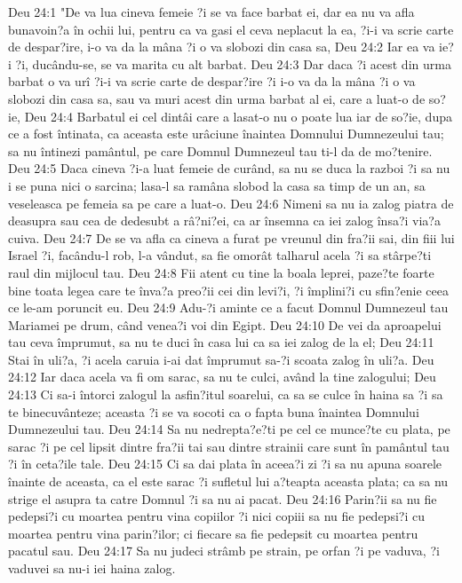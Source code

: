 Deu 24:1  "De va lua cineva femeie ?i se va face barbat ei, dar ea nu va afla bunavoin?a în ochii lui, pentru ca va gasi el ceva neplacut la ea, ?i-i va scrie carte de despar?ire, i-o va da la mâna ?i o va slobozi din casa sa,
Deu 24:2  Iar ea va ie?i ?i, ducându-se, se va marita cu alt barbat.
Deu 24:3  Dar daca ?i acest din urma barbat o va urî ?i-i va scrie carte de despar?ire ?i i-o va da la mâna ?i o va slobozi din casa sa, sau va muri acest din urma barbat al ei, care a luat-o de so?ie,
Deu 24:4  Barbatul ei cel dintâi care a lasat-o nu o poate lua iar de so?ie, dupa ce a fost întinata, ca aceasta este urâciune înaintea Domnului Dumnezeului tau; sa nu întinezi pamântul, pe care Domnul Dumnezeul tau ti-l da de mo?tenire.
Deu 24:5  Daca cineva ?i-a luat femeie de curând, sa nu se duca la razboi ?i sa nu i se puna nici o sarcina; lasa-l sa ramâna slobod la casa sa timp de un an, sa veseleasca pe femeia sa pe care a luat-o.
Deu 24:6  Nimeni sa nu ia zalog piatra de deasupra sau cea de dedesubt a râ?ni?ei, ca ar însemna ca iei zalog însa?i via?a cuiva.
Deu 24:7  De se va afla ca cineva a furat pe vreunul din fra?ii sai, din fiii lui Israel ?i, facându-l rob, l-a vândut, sa fie omorât talharul acela ?i sa stârpe?ti raul din mijlocul tau.
Deu 24:8  Fii atent cu tine la boala leprei, paze?te foarte bine toata legea care te înva?a preo?ii cei din levi?i, ?i împlini?i cu sfin?enie ceea ce le-am poruncit eu.
Deu 24:9  Adu-?i aminte ce a facut Domnul Dumnezeul tau Mariamei pe drum, când venea?i voi din Egipt.
Deu 24:10  De vei da aproapelui tau ceva împrumut, sa nu te duci în casa lui ca sa iei zalog de la el;
Deu 24:11  Stai în uli?a, ?i acela caruia i-ai dat împrumut sa-?i scoata zalog în uli?a.
Deu 24:12  Iar daca acela va fi om sarac, sa nu te culci, având la tine zalogului;
Deu 24:13  Ci sa-i întorci zalogul la asfin?itul soarelui, ca sa se culce în haina sa ?i sa te binecuvânteze; aceasta ?i se va socoti ca o fapta buna înaintea Domnului Dumnezeului tau.
Deu 24:14  Sa nu nedrepta?e?ti pe cel ce munce?te cu plata, pe sarac ?i pe cel lipsit dintre fra?ii tai sau dintre strainii care sunt în pamântul tau ?i în ceta?ile tale.
Deu 24:15  Ci sa dai plata în aceea?i zi ?i sa nu apuna soarele înainte de aceasta, ca el este sarac ?i sufletul lui a?teapta aceasta plata; ca sa nu strige el asupra ta catre Domnul ?i sa nu ai pacat.
Deu 24:16  Parin?ii sa nu fie pedepsi?i cu moartea pentru vina copiilor ?i nici copiii sa nu fie pedepsi?i cu moartea pentru vina parin?ilor; ci fiecare sa fie pedepsit cu moartea pentru pacatul sau.
Deu 24:17  Sa nu judeci strâmb pe strain, pe orfan ?i pe vaduva, ?i vaduvei sa nu-i iei haina zalog.
